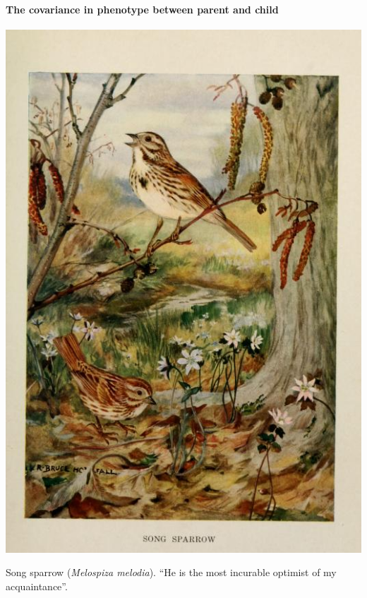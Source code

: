 
\paragraph{The covariance in phenotype between parent and child}
\begin{marginfigure}
\begin{center}
\includegraphics[width=\textwidth]{illustration_images/Quant_gen/song_sparrow/birdbiographies00ball_0165.jpg}
\end{center}
\caption{Song sparrow ({\it Melospiza melodia}). ``He is the most
  incurable optimist of my acquaintance''.
} \label{fig:song_sparrow}
\end{marginfigure}
